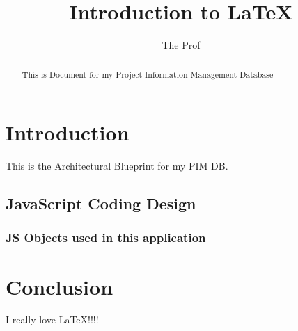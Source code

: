\documentclass{article}
\begin{document}
\title{Introduction to \LaTeX{}}
\author{The Prof}
\maketitle
\begin{abstract}
This is Document for my Project Information Management Database
\end{abstract}
\section{Introduction}
This is the Architectural Blueprint for my PIM DB.
\subsection{JavaScript Coding Design}
\subsubsection{JS Objects used in this application}
\section{Conclusion}
I really love LaTeX!!!!
\end{document}
